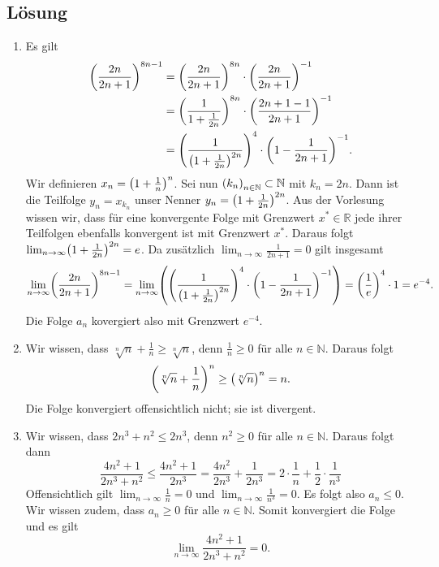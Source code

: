 \documentclass[german,12pt]{homework}
\newcommand{\NN}{\mathbb{N}}
\newcommand{\RR}{\mathbb{R}}
\DeclarePairedDelimiter{\enbrace}{(}{)}
\begin{document}
    \subsection*{Lösung}
    \begin{enumerate}
        \item Es gilt
        \begin{align*}
            \enbrace*{\frac{2n}{2n + 1}}^{8n - 1} &= \enbrace*{\frac{2n}{2n +
            1}}^{8n} \cdot \enbrace*{\frac{2n}{2n + 1}}^{-1}\\
            &= \enbrace*{\frac{1}{1 + \frac{1}{2n}}}^{8n} \cdot
            \enbrace*{\frac{2n + 1 - 1}{2n + 1}}^{-1}\\
            &= \enbrace*{\frac{1}{\enbrace*{1 + \frac{1}{2n}}^{2n}}}^4 \cdot
            \enbrace*{1 - \frac{1}{2n + 1}}^{-1}.
        \end{align*}
        Wir definieren \(x_n = \enbrace*{1 + \frac{1}{n}}^n\). Sei nun
        \(\enbrace*{k_n}_{n \in \NN} \subset \NN\) mit \(k_n = 2n\). Dann ist
        die Teilfolge \(y_n = x_{k_n}\) unser Nenner
        \(y_n = \enbrace*{1 + \frac{1}{2n}}^{2n}\). Aus der Vorlesung wissen
        wir, dass für eine konvergente Folge mit Grenzwert \(x^* \in \RR\) jede
        ihrer Teilfolgen ebenfalls konvergent ist mit Grenzwert \(x^*\). Daraus
        folgt \(\lim_{n \to \infty}\enbrace*{1 + \frac{1}{2n}}^{2n} = e\). Da
        zusätzlich \(\lim_{n \to \infty}\frac{1}{2n + 1} = 0\) gilt insgesamt
        \[\lim_{n \to \infty}\enbrace*{\frac{2n}{2n + 1}}^{8n - 1} = \lim_{n
        \to \infty}\enbrace*{\enbrace*{\frac{1}{\enbrace*{1 +
        \frac{1}{2n}}^{2n}}}^4 \cdot \enbrace*{1 - \frac{1}{2n + 1}}^{-1}} =
        \enbrace*{\frac{1}{e}}^4 \cdot 1 = e^{-4}.\]
        Die Folge \(a_n\) kovergiert also mit Grenzwert \(e^{-4}\).
        \item Wir wissen, dass \(\sqrt[n]{n} + \frac{1}{n} \ge \sqrt[n]{n}\),
        denn \(\frac{1}{n} \ge 0\) für alle \(n \in \NN\). Daraus folgt
        \[\enbrace*{\sqrt[n]{n} + \frac{1}{n}}^n \ge \enbrace*{\sqrt[n]{n}}^n =
        n.\]
        Die Folge konvergiert offensichtlich nicht; sie ist divergent.
        \item Wir wissen, dass \(2n^3 + n^2 \le 2n^3\), denn \(n^2 \ge 0\) für
        alle \(n \in \NN\). Daraus folgt dann
        \[\frac{4n^2 + 1}{2n^3 + n^2} \le \frac{4n^2 + 1}{2n^3} =
        \frac{4n^2}{2n^3} + \frac{1}{2n^3} = 2 \cdot \frac{1}{n} + \frac{1}{2}
        \cdot \frac{1}{n^3}\]
        Offensichtlich gilt \(\lim_{n \to \infty}\frac{1}{n} = 0\) und
        \(\lim_{n \to \infty}\frac{1}{n^3} = 0\). Es folgt also \(a_n \le 0\).
        Wir wissen zudem, dass \(a_n \ge 0\) für alle \(n \in \NN\). Somit
        konvergiert die Folge und es gilt
        \[\lim_{n \to \infty}\frac{4n^2 + 1}{2n^3 + n^2} = 0.\]
    \end{enumerate}
\end{document}
